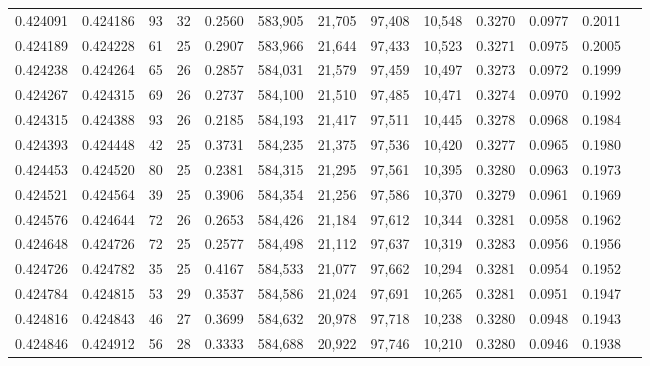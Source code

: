 \begin{tabular}{rrrrrrrrrrrrr}
0.424091 & 0.424186 &    93 &  32 &                                     0.2560 & 583,905 &  21,705 &  97,408 &  10,548 & 0.3270 & 0.0977 & 0.2011 \\
0.424189 & 0.424228 &    61 &  25 &                                     0.2907 & 583,966 &  21,644 &  97,433 &  10,523 & 0.3271 & 0.0975 & 0.2005 \\
0.424238 & 0.424264 &    65 &  26 &                                     0.2857 & 584,031 &  21,579 &  97,459 &  10,497 & 0.3273 & 0.0972 & 0.1999 \\
0.424267 & 0.424315 &    69 &  26 &                                     0.2737 & 584,100 &  21,510 &  97,485 &  10,471 & 0.3274 & 0.0970 & 0.1992 \\
0.424315 & 0.424388 &    93 &  26 &                                     0.2185 & 584,193 &  21,417 &  97,511 &  10,445 & 0.3278 & 0.0968 & 0.1984 \\
0.424393 & 0.424448 &    42 &  25 &                                     0.3731 & 584,235 &  21,375 &  97,536 &  10,420 & 0.3277 & 0.0965 & 0.1980 \\
0.424453 & 0.424520 &    80 &  25 &                                     0.2381 & 584,315 &  21,295 &  97,561 &  10,395 & 0.3280 & 0.0963 & 0.1973 \\
0.424521 & 0.424564 &    39 &  25 &                                     0.3906 & 584,354 &  21,256 &  97,586 &  10,370 & 0.3279 & 0.0961 & 0.1969 \\
0.424576 & 0.424644 &    72 &  26 &                                     0.2653 & 584,426 &  21,184 &  97,612 &  10,344 & 0.3281 & 0.0958 & 0.1962 \\
0.424648 & 0.424726 &    72 &  25 &                                     0.2577 & 584,498 &  21,112 &  97,637 &  10,319 & 0.3283 & 0.0956 & 0.1956 \\
0.424726 & 0.424782 &    35 &  25 &                                     0.4167 & 584,533 &  21,077 &  97,662 &  10,294 & 0.3281 & 0.0954 & 0.1952 \\
0.424784 & 0.424815 &    53 &  29 &                                     0.3537 & 584,586 &  21,024 &  97,691 &  10,265 & 0.3281 & 0.0951 & 0.1947 \\
0.424816 & 0.424843 &    46 &  27 &                                     0.3699 & 584,632 &  20,978 &  97,718 &  10,238 & 0.3280 & 0.0948 & 0.1943 \\
0.424846 & 0.424912 &    56 &  28 &                                     0.3333 & 584,688 &  20,922 &  97,746 &  10,210 & 0.3280 & 0.0946 & 0.1938 \\

\end{tabular}
